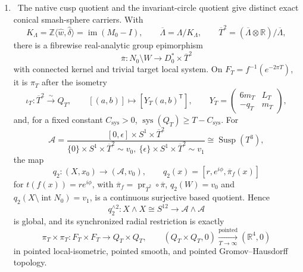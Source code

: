 \begin{enumerate}[leftmargin=1.8em]
\[\]
where \([N]\) has degree \(N^2\) and ramification index \(N\) on each of
the six toric boundary curves.  Over \(v\ne0\), \(Q_N\) is the cover for
\[
 \mathbb Z\langle\widehat\gamma,\widehat u,
 N\widehat w,N\widehat\delta\rangle\subset\Lambda,
 \qquad \operatorname{Deck}(Q_N)\cong(\mathbb Z/N\mathbb Z)^2,
\]
and, with \(S_N=\operatorname{diag}(1,1,N,N)\),
\[
 S_N^{-1}M_0^NS_N=M_0.
\]
This is a local completed-cusp morphism, not a degree-
\(N^2\) self-map over the unchanged disc, not a normalization, and not a
cover over the entire base; see
\cref{cusp-cover-extension-theorem,cusp-cover-naive-action-failure,%
cusp-cover-global-scope}.
Its use in four-dimensional finite-cover unspooling is an ancillary
construction: it changes both the fibre lattice and the cusp base.  It does
not answer the native \(S^{12}\)/\(S^{24}\) sphere-route problem, whose
solution begins from the unaltered quotient fibres \(Q_T\) and \(C_T\).

\item \Verified\ The native cusp quotient and the invariant-circle quotient
give distinct exact conical smash-sphere carriers.  With
\[
 K_\Lambda=\mathbb Z\langle\widehat w,\widehat\delta\rangle
 =\operatorname{im}(M_0-I),\qquad
 \overline\Lambda=\Lambda/K_\Lambda,\qquad
 \overline T^2=(\overline\Lambda\otimes\mathbb R)/\overline\Lambda,
\]
there is a fibrewise real-analytic group epimorphism
\[
 \overline\pi:N_0\setminus W\longrightarrow D_0^*\times\overline T^2
\]
with connected kernel and trivial target local system.  On
\(F_T=f^{-1}(e^{-2\pi T})\), it is \(\pi_T\) after the isometry
\[
 \iota_T:\overline T^2\xrightarrow{\sim}Q_T,\qquad
 [(a,b)]\longmapsto[Y_T(a,b)^{\mathsf T}],\qquad
 Y_T=\begin{pmatrix}6m_T&L_T\\-q_T&m_T\end{pmatrix},
\]
 and, for a fixed constant \(C_{\mathrm{sys}}>0\),
 \(\operatorname{sys}(Q_T)\ge T-C_{\mathrm{sys}}\).  For
\[
 \mathcal A=
 \frac{[0,\epsilon]\times S^1\times\overline T^2}
 {\{0\}\times S^1\times\overline T^2\sim v_0,
  \ \{\epsilon\}\times S^1\times\overline T^2\sim v_1}
 \cong\operatorname{Susp}(T^3),
\]
the map
\[
 q_2:(X,x_0)\longrightarrow(\mathcal A,v_0),\qquad
 q_2(x)=[r,e^{i\phi},\overline\pi_f(x)]
\]
for \(t(f(x))=re^{i\phi}\), with
\(\overline\pi_f=\operatorname{pr}_{\overline T^2}\circ\overline\pi\),
\(q_2(W)=v_0\) and
\(q_2(X\setminus\operatorname{int}N_0)=v_1\), is a continuous surjective
based quotient.  Hence
\[
 q_2^{\wedge2}:X\wedge X\cong S^{12}\longrightarrow
 \mathcal A\wedge\mathcal A
\]
is global, and its synchronized radial restriction is exactly
\[
 \pi_T\times\pi_T:F_T\times F_T\longrightarrow Q_T\times Q_T,
 \qquad
 (Q_T\times Q_T,0)
 \xrightarrow[T\to\infty]{\mathrm{pointed}}(\mathbb R^4,0)
\]
in pointed local-isometric, pointed smooth, and pointed
Gromov--Hausdorff topology.


\end{enumerate}
